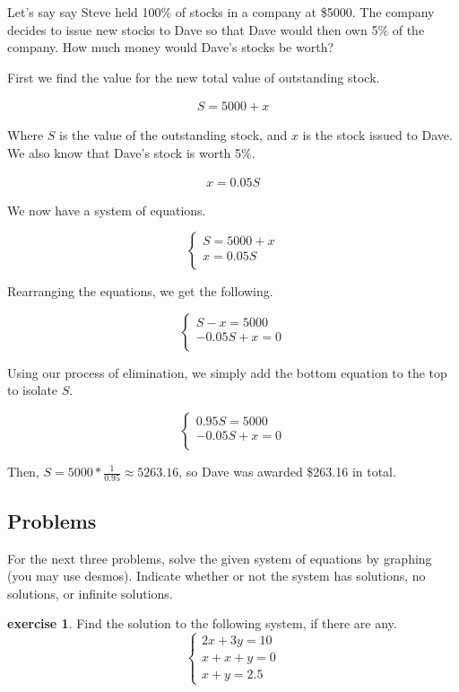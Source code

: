 \documentclass{scrbook}
\theoremstyle{definition}
\newtheorem{exercise}{exercise}[subsection]
\begin{document}
Let's say say Steve held 100\% of stocks in a company at \$5000. The company decides to issue new stocks to Dave so that Dave would then own 5\% of the company. How much money would Dave's stocks be worth?

First we find the value for the new total value of outstanding stock.

\begin{align*}
  S = 5000 + x
\end{align*}

Where $S$ is the value of the outstanding stock, and $x$ is the stock issued to Dave. We also know that Dave's stock is worth 5\%. 

\begin{align*}
  x = 0.05S
\end{align*}

We now have a system of equations.

\[
  \begin{cases}
    S = 5000 + x\\
    x = 0.05S\\
  \end{cases}
\]

Rearranging the equations, we get the following.

\[
  \begin{cases}
    S - x = 5000\\
    -0.05S + x = 0\\
  \end{cases}
\]

Using our process of elimination, we simply add the bottom equation to the top to isolate $S$. 

\[
  \begin{cases}
    0.95S = 5000\\
    -0.05S + x = 0\\
  \end{cases}
\]

Then, $S = 5000 * \frac{1}{0.95} \approx 5263.16$, so Dave was awarded \$263.16 in total.  

\subsection{Problems}

For the next three problems, solve the given system of equations by graphing (you may use desmos). Indicate whether or not the system has solutions, no solutions, or infinite solutions.

\begin{exercise} Find the solution to the following system, if there are any.
  \[
    \begin{cases}
      2x + 3y = 10\\
      x + x + y = 0\\
      x + y = 2.5
    \end{cases}
  \]
\end{exercise}
\end{document}

